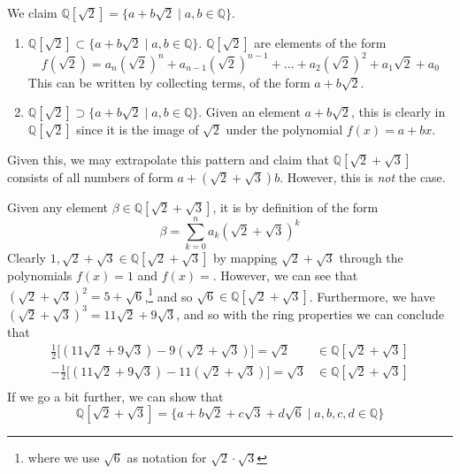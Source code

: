     \begin{example}
      We claim $\mathbb{Q}[\sqrt{2}] = \{a + b \sqrt{2} \mid a, b \in \mathbb{Q} \}$.
      \begin{enumerate}
        \item $\mathbb{Q}[\sqrt{2}] \subset \{a + b \sqrt{2} \mid a, b \in \mathbb{Q} \}$. $\mathbb{Q}[\sqrt{2}]$ are elements of the form
        \begin{equation}
          f(\sqrt{2}) = a_n (\sqrt{2})^n + a_{n-1} (\sqrt{2})^{n-1} + \ldots + a_2 (\sqrt{2})^2 + a_1 \sqrt{2} + a_0
        \end{equation} 
        This can be written by collecting terms, of the form $a + b \sqrt{2}$. 

        \item $\mathbb{Q}[\sqrt{2}] \supset \{a + b \sqrt{2} \mid a, b \in \mathbb{Q} \}$. Given an element $a + b \sqrt{2}$, this is clearly in $\mathbb{Q}[\sqrt{2}]$ since it is the image of $\sqrt{2}$ under the polynomial $f(x) = a + bx$. 
      \end{enumerate}
    \end{example} 

    Given this, we may extrapolate this pattern and claim that $\mathbb{Q}[\sqrt{2} + \sqrt{3}]$ consists of all numbers of form $a + (\sqrt{2} + \sqrt{3}) b$. However, this is \textit{not} the case. 

    \begin{example}
      Given any element $\beta \in \mathbb{Q}[\sqrt{2} + \sqrt{3}]$, it is by definition of the form 
      \begin{equation}
        \beta = \sum_{k=0}^n a_k (\sqrt{2} + \sqrt{3})^k 
      \end{equation} 
      Clearly $1, \sqrt{2} + \sqrt{3} \in \mathbb{Q}[\sqrt{2} + \sqrt{3}]$ by mapping $\sqrt{2} + \sqrt{3}$ through the polynomials $f(x) = 1$ and $f(x) = $. However, we can see that $(\sqrt{2} + \sqrt{3})^2 = 5 + \sqrt{6}$,\footnote{where we use $\sqrt{6}$ as notation for $\sqrt{2} \cdot \sqrt{3}$} and so $\sqrt{6} \in \mathbb{Q}[\sqrt{2} + \sqrt{3}]$. Furthermore, we have $(\sqrt{2} + \sqrt{3})^3 = 11 \sqrt{2} + 9 \sqrt{3}$, and so with the ring properties we can conclude that 
      \begin{align}
        \frac{1}{2} \big[ (11 \sqrt{2} + 9 \sqrt{3}) - 9 (\sqrt{2} + \sqrt{3})\big] = \sqrt{2} & \in \mathbb{Q}[\sqrt{2} + \sqrt{3}] \\
        -\frac{1}{2} \big[ (11 \sqrt{2} + 9 \sqrt{3}) - 11 (\sqrt{2} + \sqrt{3})\big] = \sqrt{3} & \in \mathbb{Q}[\sqrt{2} + \sqrt{3}] \\
      \end{align} 
      If we go a bit further, we can show that 
      \begin{equation}
        \mathbb{Q}[\sqrt{2} + \sqrt{3}] = \{a + b \sqrt{2} + c \sqrt{3} + d\sqrt{6} \mid a, b, c, d \in \mathbb{Q} \}
      \end{equation}
    \end{example}

